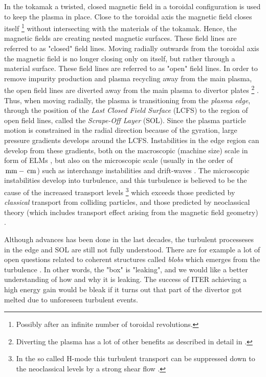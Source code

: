 In the tokamak a twisted, closed magnetic field in a toroidal configuration is used to keep the plasma in place.
Close to the toroidal axis the magnetic field closes itself%
%
\footnote{Possibly after an infinite number of toroidal revolutions.}
%
without intersecting with the materials of the tokamak.
Hence, the magnetic fields are creating nested magnetic surfaces.
These field lines are referred to as "closed" field lines.
Moving radially outwards from the toroidal axis the magnetic field is no longer closing only on itself, but rather through a material surface.
These field lines are referred to as "open" field lines.
In order to remove impurity production and plasma recycling away from the main plasma, the open field lines are diverted away from the main plasma to divertor plates%
%
\footnote{Diverting the plasma has a lot of other benefits as described in detail in \cite{Stangeby2000book,Stacey2012book}.}%
%
.
Thus, when moving radially, the plasma is transitioning from the \emph{plasma edge}, through the position of the \emph{Last Closed Field Surface} (LCFS) to the region of open field lines, called the \emph{Scrape-Off Layer} (SOL).
Since the plasma particle motion is constrained in the radial direction because of the gyration, large pressure gradients develops around the LCFS.
Instabilities in the edge region can develop from these gradients, both on the macroscopic (machine size) scale in form of ELMs \cite{Zohm1996}, but also on the microscopic scale (usually in the order of $\, \text{mm} - \, \text{cm}$) such as interchange instabilities \cite{Scott2005b} and drift-waves \cite{Tynan2009}.
The microscopic instabilities develop into turbulence, and this turbulence is believed to be the cause of the increased transport levels%
%
\footnote{In the so called H-mode this turbulent transport can be suppressed down to the neoclassical levels by a strong shear flow \cite{Burrell1997}.} %
%
which exceeds those predicted by \emph{classical} transport from colliding particles, and those predicted by neoclassical theory (which includes transport effect arising from the magnetic field geometry) \cite{Wootton1990}.

Although advances has been done in the last decades, the turbulent processeses in the edge and SOL are still not fully understood.
There are for example a lot of open questions related to coherent structures called \emph{blobs} which emerges from the turbulence \cite{DIppolito2011}.
In other words, the "box" is "leaking", and we would like a better understanding of how and why it is leaking.
The success of ITER achieving a high energy gain would be bleak if it turns out that part of the divertor got melted due to unforeseen turbulent events.

